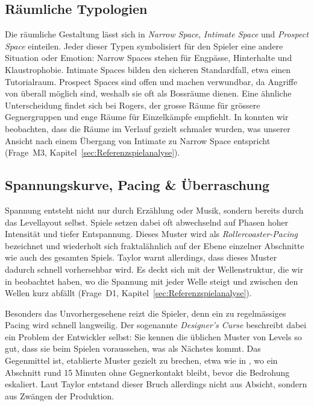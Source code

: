 \documentclass[../Main.tex]{subfiles}
\begin{document}
\subsection{Räumliche Typologien} \label{sec:Raumtypologien}
Die räumliche Gestaltung lässt sich in \textit{Narrow Space}, \textit{Intimate Space} und \textit{Prospect Space} einteilen. Jeder dieser Typen symbolisiert für den Spieler eine andere Situation oder Emotion: Narrow Spaces stehen für Engpässe, Hinterhalte und Klaustrophobie. Intimate Spaces bilden den sicheren Standardfall, etwa einen Tutorialraum. Prospect Spaces sind offen und machen verwundbar, da Angriffe von überall möglich sind, weshalb sie oft als Bossräume dienen.\autocite[161--168]{totten2014architectural} Eine ähnliche Unterscheidung findet sich bei Rogers, der grosse Räume für grössere Gegnergruppen und enge Räume für Einzelkämpfe empfiehlt.\autocite[245]{rogers2014levelup} In  konnten wir beobachten, dass die Räume im Verlauf gezielt schmaler wurden, was unserer Ansicht nach einem Übergang von Intimate zu Narrow Space entspricht (Frage~M3, Kapitel~\ref{sec:Referenzspielanalyse}).

\subsection{Spannungskurve, Pacing \& Überraschung} \label{sec:Pacing}
Spannung entsteht nicht nur durch Erzählung oder Musik, sondern bereits durch das Levellayout selbst. Spiele setzen dabei oft abwechselnd auf Phasen hoher Intensität und tiefer Entspannung. Dieses Muster wird als \textit{Rollercoaster-Pacing} bezeichnet und wiederholt sich fraktalähnlich auf der Ebene einzelner Abschnitte wie auch des gesamten Spiels. Taylor warnt allerdings, dass dieses Muster dadurch schnell vorhersehbar wird.\autocite{gdc_tenprinciples2010} Es deckt sich mit der Wellenstruktur, die wir in  beobachtet haben, wo die Spannung mit jeder Welle steigt und zwischen den Wellen kurz abfällt (Frage~D1, Kapitel~\ref{sec:Referenzspielanalyse}).

Besonders das Unvorhergesehene reizt die Spieler, denn ein zu regelmässiges Pacing wird schnell langweilig. Der sogenannte \textit{Designer's Curse} beschreibt dabei ein Problem der Entwickler selbst: Sie kennen die üblichen Muster von Levels so gut, dass sie beim Spielen voraussehen, was als Nächstes kommt. Das Gegenmittel ist, etablierte Muster gezielt zu brechen, etwa wie in ,\autocite{visceral_deadspace2_2011} wo ein Abschnitt rund 15 Minuten ohne Gegnerkontakt bleibt, bevor die Bedrohung eskaliert. Laut Taylor entstand dieser Bruch allerdings nicht aus Absicht, sondern aus Zwängen der Produktion.\autocite{gdc_tenprinciples2010}
\end{document}
